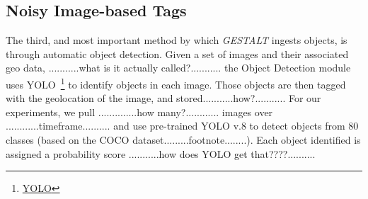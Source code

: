 \subsection{Noisy Image-based Tags}
The third, and most important method by which \emph{GESTALT} ingests objects, is through automatic object detection.
Given a set of images and their associated geo data, ...........what is it actually called?........... the Object Detection module uses YOLO~\footnote{\href{https://github.com/ultralytics/ultralytics}{YOLO}} to identify objects in each image. Those objects are then tagged with the geolocation of the image, and stored...........how?........... For our experiments, we pull ..............how many?............ images over ............timeframe.......... and use pre-trained YOLO v.8 to detect objects from 80 classes (based on the COCO dataset.........footnote........). Each object identified is assigned a probability score ...........how does YOLO get that????..........





